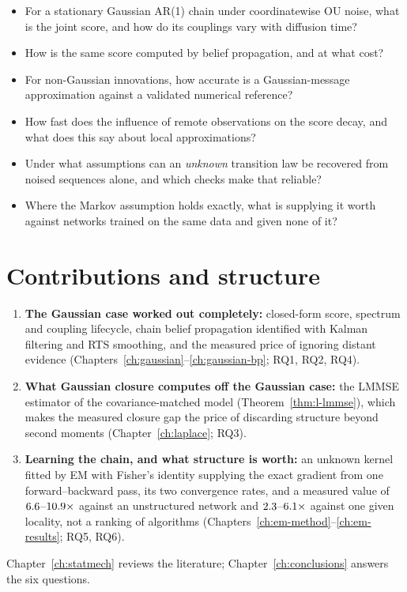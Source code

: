 \begin{itemize}[nosep, leftmargin=*]
  \item[\textbf{RQ1.}] For a stationary Gaussian AR(1) chain under
  coordinatewise OU noise, what is the joint score, and how do its couplings
  vary with diffusion time?
  \item[\textbf{RQ2.}] How is the same score computed by belief propagation,
  and at what cost?
  \item[\textbf{RQ3.}] For non-Gaussian innovations, how accurate is a
  Gaussian-message approximation against a validated numerical reference?
  \item[\textbf{RQ4.}] How fast does the influence of remote observations on
  the score decay, and what does this say about local approximations?
  \item[\textbf{RQ5.}] Under what assumptions can an \emph{unknown} transition
  law be recovered from noised sequences alone, and which checks make that
  reliable?
  \item[\textbf{RQ6.}] Where the Markov assumption holds exactly, what is
  supplying it worth against networks trained on the same data and given
  none of it?
\end{itemize}

\section{Contributions and structure}

\begin{enumerate}[nosep, leftmargin=*]
  \item \textbf{The Gaussian case worked out completely:} closed-form score,
  spectrum and coupling lifecycle, chain belief propagation identified with
  Kalman filtering and RTS smoothing, and the measured price of ignoring
  distant evidence (Chapters~\ref{ch:gaussian}--\ref{ch:gaussian-bp}; RQ1,
  RQ2, RQ4).
  \item \textbf{What Gaussian closure computes off the Gaussian case:} the
  LMMSE estimator of the covariance-matched model
  (Theorem~\ref{thm:l-lmmse}), which makes the measured closure gap the price
  of discarding structure beyond second moments (Chapter~\ref{ch:laplace};
  RQ3).
  \item \textbf{Learning the chain, and what structure is worth:} an unknown
  kernel fitted by EM with Fisher's identity supplying the exact gradient
  from one forward--backward pass, its two convergence rates, and a measured
  value of $6.6$--$10.9\times$ against an unstructured network and
  $2.3$--$6.1\times$ against one given locality, not a
  ranking of algorithms (Chapters~\ref{ch:em-method}--\ref{ch:em-results};
  RQ5, RQ6).
\end{enumerate}
Chapter~\ref{ch:statmech} reviews the literature; Chapter~\ref{ch:conclusions}
answers the six questions.
